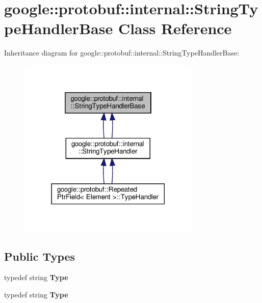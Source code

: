 \hypertarget{classgoogle_1_1protobuf_1_1internal_1_1StringTypeHandlerBase}{}\section{google\+:\+:protobuf\+:\+:internal\+:\+:String\+Type\+Handler\+Base Class Reference}
\label{classgoogle_1_1protobuf_1_1internal_1_1StringTypeHandlerBase}


Inheritance diagram for google\+:\+:protobuf\+:\+:internal\+:\+:String\+Type\+Handler\+Base\+:
\nopagebreak
\begin{figure}[H]
\begin{center}
\leavevmode
\includegraphics[width=246pt]{classgoogle_1_1protobuf_1_1internal_1_1StringTypeHandlerBase__inherit__graph}
\end{center}
\end{figure}
\subsection*{Public Types}
\begin{DoxyCompactItemize}
\item 
\mbox{\label{classgoogle_1_1protobuf_1_1internal_1_1StringTypeHandlerBase_a50221f3d5df26decc1e3d7c061f6ca23}} 
typedef string {\bfseries Type}
\item 
\mbox{\label{classgoogle_1_1protobuf_1_1internal_1_1StringTypeHandlerBase_a50221f3d5df26decc1e3d7c061f6ca23}} 
typedef string {\bfseries Type}
\end{DoxyCompactItemize}
